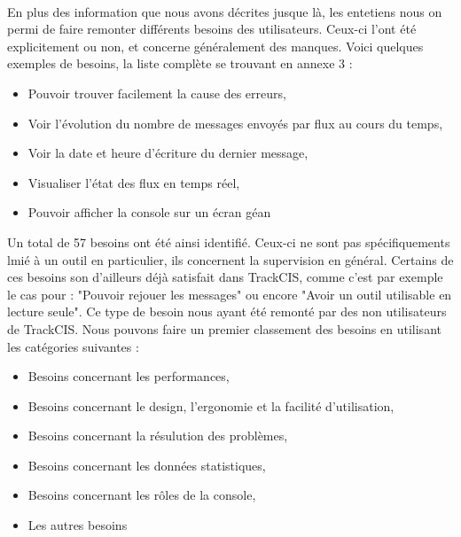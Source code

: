 			\paragraph{}%
			En plus des information que nous avons décrites jusque là, les entetiens nous
			on permi de faire remonter différents besoins des utilisateurs. Ceux-ci l'ont
			été explicitement ou non, et concerne généralement des manques. Voici
			quelques exemples de besoins, la liste complète se trouvant en annexe 3 :
			\begin{itemize}
			  \item Pouvoir trouver facilement la cause des erreurs,
			  \item Voir l'évolution du nombre de messages envoyés par flux au cours du
			  temps,
			  \item Voir la date et heure d'écriture du dernier message,
			  \item Visualiser l'état des flux en temps réel,
			  \item Pouvoir afficher la console sur un écran géan
			\end{itemize}
			Un total de 57 besoins ont été ainsi identifié. Ceux-ci ne sont pas
			spécifiquements lmié à un outil en particulier, ils concernent la supervision
			en général. Certains de ces besoins son d'ailleurs déjà satisfait dans
			TrackCIS, comme c'est par exemple le cas pour : "Pouvoir rejouer les
			messages" ou encore "Avoir un outil utilisable en lecture seule". Ce type de
			besoin nous ayant été remonté par des non utilisateurs de TrackCIS. Nous
			pouvons faire un premier classement des besoins en utilisant les catégories
			suivantes :
			\begin{itemize}
			  \item Besoins concernant les performances,
			  \item Besoins concernant le design, l'ergonomie et la facilité
			  d'utilisation,
			  \item Besoins concernant la résulution des problèmes,
			  \item Besoins concernant les données statistiques,
			  \item Besoins concernant les rôles de la console,
			  \item Les autres besoins
			\end{itemize}
			
